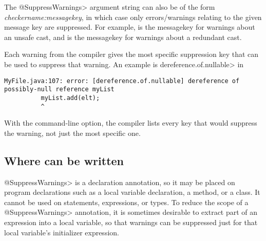 The \<@SuppressWarnings> argument string can also  be of the form
\emph{checkername:messagekey}, in which case only
errors/warnings relating to the given message key are suppressed.  For example,
 is the messagekey for warnings about an unsafe cast, and
 is the messagekey for warnings about a redundant cast.

Each warning from the compiler gives the most specific
suppression key that can be used to suppress that warning.
An example is \<dereference.of.nullable> in

\begin{smaller}
\begin{Verbatim}
MyFile.java:107: error: [dereference.of.nullable] dereference of possibly-null reference myList
          myList.add(elt);
          ^
\end{Verbatim}
\end{smaller}

\noindent
With the  command-line option,
the compiler lists every key that would suppress the warning,
not just the most specific one.

%


\subsection{Where  can be written\label{suppresswarnings-annotation-locations}}

\<@SuppressWarnings> is a declaration annotation, so it may be placed on
program declarations such as a local variable declaration, a method, or a
class.  It cannot be used on statements, expressions, or types.  To reduce
the scope of a \<@SuppressWarnings> annotation, it is sometimes desirable
to extract part of an expression into a local variable, so that warnings
can be suppressed just for that local variable's initializer expression.

